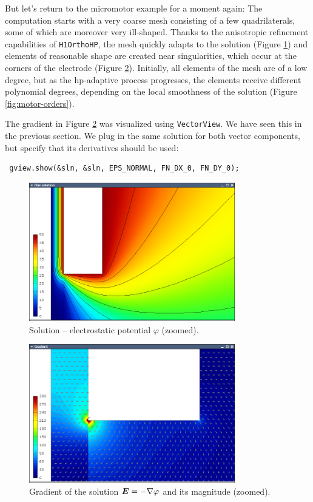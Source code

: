 \documentclass[11pt]{article}
\newcommand{\bfE}{\mbox{\boldmath $E$}}
\begin{document}
But let's return to the micromotor example for a moment again: The computation
starts with a very coarse mesh consisting of a few quadrilaterals, some
of which are moreover very ill-shaped. Thanks to the anisotropic refinement
capabilities of {\tt H1OrthoHP}, the mesh quickly adapts to the solution (Figure \ref{fig:motor-sln})
and elements of reasonable shape are created near singularities, which occur
at the corners of the electrode (Figure \ref{fig:motor-grad}). Initially, all elements of the mesh
are of a low degree, but as the hp-adaptive process progresses, the elements
receive different polynomial degrees, depending on the local smoothness of the
solution (Figure \ref{fig:motor-orders}).

The gradient in Figure \ref{fig:motor-grad} was visualized using {\tt VectorView}. We have
seen this in the previous section. We plug in the same solution for both vector
components, but specify that its derivatives should be used:
\begin{lstlisting}
 gview.show(&sln, &sln, EPS_NORMAL, FN_DX_0, FN_DY_0);
\end{lstlisting}


\begin{figure}[!ht]
  \medskip \centering
  \includegraphics[width=0.8\textwidth]{img/motor-sln.png}
  \caption{Solution -- electrostatic potential $\varphi$ (zoomed).}
  \label{fig:motor-sln}
\end{figure}

\begin{figure}[!ht]
  \medskip \centering
  \includegraphics[width=0.8\textwidth]{img/motor-grad.png}
  \caption{Gradient of the solution $\bfE = -\nabla\varphi$ and its magnitude (zoomed).}
  \label{fig:motor-grad}
\end{figure}
\end{document}
